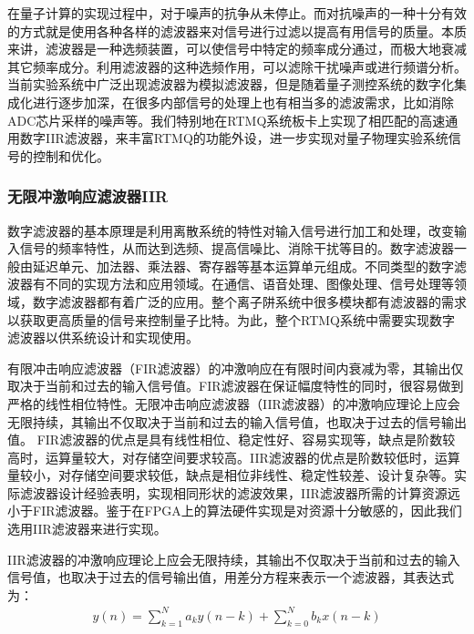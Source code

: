 在量子计算的实现过程中，对于噪声的抗争从未停止。而对抗噪声的一种十分有效的方式就是使用各种各样的滤波器来对信号进行过滤以提高有用信号的质量。本质来讲，滤波器是一种选频装置，可以使信号中特定的频率成分通过，而极大地衰减其它频率成分。利用滤波器的这种选频作用，可以滤除干扰噪声或进行频谱分析。
当前实验系统中广泛出现滤波器为模拟滤波器，但是随着量子测控系统的数字化集成化进行逐步加深，在很多内部信号的处理上也有相当多的滤波需求，比如消除ADC芯片采样的噪声等。我们特别地在RTMQ系统板卡上实现了相匹配的高速通用数字IIR滤波器，来丰富RTMQ的功能外设，进一步实现对量子物理实验系统信号的控制和优化。


\subsubsection[无限冲激响应滤波器IIR]{无限冲激响应滤波器IIR}
数字滤波器的基本原理是利用离散系统的特性对输入信号进行加工和处理，改变输入信号的频率特性，从而达到选频、提高信噪比、消除干扰等目的。数字滤波器一般由延迟单元、加法器、乘法器、寄存器等基本运算单元组成。不同类型的数字滤波器有不同的实现方法和应用领域。在通信、语音处理、图像处理、信号处理等领域，数字滤波器都有着广泛的应用。整个离子阱系统中很多模块都有滤波器的需求以获取更高质量的信号来控制量子比特。为此，整个RTMQ系统中需要实现数字滤波器以供系统设计和实现使用。

有限冲击响应滤波器（FIR滤波器）的冲激响应在有限时间内衰减为零，其输出仅取决于当前和过去的输入信号值。FIR滤波器在保证幅度特性的同时，很容易做到严格的线性相位特性。无限冲击响应滤波器（IIR滤波器）的冲激响应理论上应会无限持续，其输出不仅取决于当前和过去的输入信号值，也取决于过去的信号输出值。
FIR滤波器的优点是具有线性相位、稳定性好、容易实现等，缺点是阶数较高时，运算量较大，对存储空间要求较高。IIR滤波器的优点是阶数较低时，运算量较小，对存储空间要求较低，缺点是相位非线性、稳定性较差、设计复杂等。实际滤波器设计经验表明，实现相同形状的滤波效果，IIR滤波器所需的计算资源远小于FIR滤波器。鉴于在FPGA上的算法硬件实现是对资源十分敏感的，因此我们选用IIR滤波器来进行实现。

IIR滤波器的冲激响应理论上应会无限持续，其输出不仅取决于当前和过去的输入信号值，也取决于过去的信号输出值，用差分方程来表示一个滤波器，其表达式为：
\begin{align}
    y(n)=\sum_{k=1}^Na_ky(n-k)+\sum_{k=0}^Nb_kx(n-k)\label{eq:iir_filter}
\end{align}


